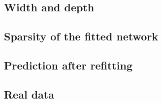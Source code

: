 \subsection{Width and depth}\label{sec:exp-arch}

\subsection{Sparsity of the fitted network}\label{sec:exp-sparsity}

\subsection{Prediction after refitting}\label{sec:exp-prediction}

\subsection{Real data}\label{sec:exp-real}

